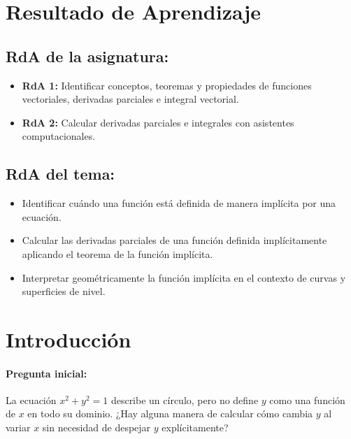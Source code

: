\documentclass[a4,11pt]{aleph-notas}
\begin{document}
\encabezado

\section*{Resultado de Aprendizaje}

\subsection*{RdA de la asignatura:}
\begin{itemize}[leftmargin=*]
    \item \textbf{RdA 1:} Identificar conceptos, teoremas y propiedades de funciones vectoriales, derivadas parciales e integral vectorial.
    \item \textbf{RdA 2:} Calcular derivadas parciales e integrales con asistentes computacionales.
\end{itemize}

\subsection*{RdA del tema:}
\begin{itemize}[leftmargin=*]
    \item Identificar cuándo una función está definida de manera implícita por una ecuación.
    \item Calcular las derivadas parciales de una función definida implícitamente aplicando el teorema de la función implícita.
    \item Interpretar geométricamente la función implícita en el contexto de curvas y superficies de nivel.
\end{itemize}

\section*{Introducción}

\paragraph{Pregunta inicial:}
La ecuación $x^2 + y^2 = 1$ describe un círculo, pero no define $y$ como una función de $x$ en todo su dominio. ¿Hay alguna manera de calcular cómo cambia $y$ al variar $x$ sin necesidad de despejar $y$ explícitamente?
\end{document}
